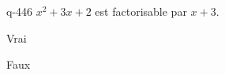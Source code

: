 \begin{truefalse}{q-446}
$x^2+3x+2$ est factorisable par $x+3$.
\item Vrai
\item* Faux
\end{truefalse}

